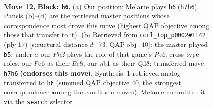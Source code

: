 \documentclass[11pt]{article}
\begin{document}
\clearpage

\begin{figure}[p]\centering
\begin{subfigure}{0.46\textwidth}\centering
\resizebox{\linewidth}{!}{%
\newchessgame
\chessboard[
  setfen={rnbq1rk1/pp1n1pbp/4p1p1/3p4/P2P4/1B1Q1N2/RPP2PPP/1NB1R1K1 b - - 2 12},
  showmover=false,
  pgfstyle=straightmove, color=movearrow, markmove={h7-h6}
]}
\caption{}
\end{subfigure}\hfill
\begin{subfigure}{0.46\textwidth}\centering
\resizebox{\linewidth}{!}{%
\newchessgame
\chessboard[
  setfen={r1bq1rk1/pp1n1ppp/2pbpn2/8/2BP4/2N1PN2/PPQ2PPP/R1B2RK1 b - - 0 9},
  showmover=false,
  pgfstyle=straightmove, color=movearrow, markmove={b7-b5}
]}
\caption{}
\end{subfigure}
\\[4pt]

\caption{\textbf{Move 12, Black: \texttt{h6}.} (a) Our position; Melanie plays \texttt{h6} (\texttt{h7h6}). Panels (b)--(d) are the retrieved master positions whose correspondence most drove this move (highest QAP objective among those that transfer to it). (b) Retrieved from \texttt{ccrl\_top\_p0002\#1142} (ply 17) [structural distance $d$=73, QAP obj=40]: the master played \texttt{b5}; under $\mu$ our \emph{Ph2} plays the role of that game's \emph{Pb2}; cross-type roles: our \emph{P}e6 as their \emph{B}c8, our \emph{n}b1 as their \emph{Q}d8; transferred move \texttt{h7h6} \textbf{(endorses this move)}. Synthesis: 1 retrieved analog transferred to \texttt{h6} (summed QAP objective 40, the strongest correspondence among the candidate moves); Melanie committed it via the \texttt{search} selector.}
\label{fig:thought-m23}
\end{figure}

\clearpage
\end{document}
